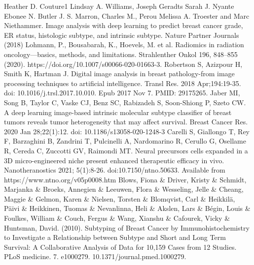 \documentclass[final,1p,times,twocolumn]{elsarticle}
\begin{document}








\begin{thebibliography}{00}


 Heather D. Couture1 Lindsay A. Williams, Joseph Geradts Sarah J. Nyante Ebonee N. Butler J. S. Marron, Charles M., Perou Melissa A. Troester and Marc Niethammer. Image analysis with deep learning to predict breast cancer grade, ER status, histologic subtype, and intrinsic subtype. Nature Partner Journals (2018)
 Lohmann, P., Bousabarah, K., Hoevels, M. et al. Radiomics in radiation oncology—basics, methods, and limitations. Strahlenther Onkol 196, 848–855 (2020). https://doi.org/10.1007/s00066-020-01663-3. 
 Robertson S, Azizpour H, Smith K, Hartman J. Digital image analysis in breast pathology-from image processing techniques to artificial intelligence. Transl Res. 2018 Apr;194:19-35. doi: 10.1016/j.trsl.2017.10.010. Epub 2017 Nov 7. PMID: 29175265.
 Jaber MI, Song B, Taylor C, Vaske CJ, Benz SC, Rabizadeh S, Soon-Shiong P, Szeto CW. A deep learning image-based intrinsic molecular subtype classifier of breast tumors reveals tumor heterogeneity that may affect survival. Breast Cancer Res. 2020 Jan 28;22(1):12. doi: 10.1186/s13058-020-1248-3
 Carelli S, Giallongo T, Rey F, Barzaghini B, Zandrini T, Pulcinelli A, Nardomarino R, Cerullo G, Osellame R, Cereda C, Zuccotti GV, Raimondi MT. Neural precursors cells expanded in a 3D micro-engineered niche present enhanced therapeutic efficacy in vivo. Nanotheranostics 2021; 5(1):8-26. doi:10.7150/ntno.50633. Available from https://www.ntno.org/v05p0008.htm
 Blows, Fiona \& Driver, Kristy \& Schmidt, Marjanka \& Broeks, Annegien \& Leeuwen, Flora \& Wesseling, Jelle \& Cheang, Maggie \& Gelmon, Karen \& Nielsen, Torsten \& Blomqvist, Carl \& Heikkilä, Päivi \& Heikkinen, Tuomas \& Nevanlinna, Heli \& Akslen, Lars \& Bégin, Louis \& Foulkes, William \& Couch, Fergus \& Wang, Xianshu \& Cafourek, Vicky \& Huntsman, David. (2010). Subtyping of Breast Cancer by Immunohistochemistry to Investigate a Relationship between Subtype and Short and Long Term Survival: A Collaborative Analysis of Data for 10,159 Cases from 12 Studies. PLoS medicine. 7. e1000279. 10.1371/journal.pmed.1000279.

\end{thebibliography}
\end{document}
